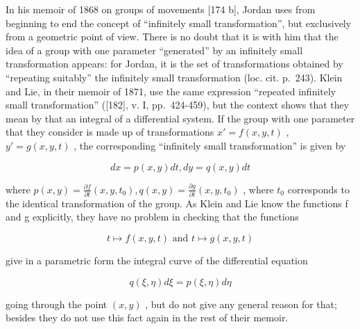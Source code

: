 In his memoir of 1868 on groups of movements {[}174 b{]}, Jordan uses from beginning to end the concept of ``infinitely small transformation'', but exclusively from a geometric point of view. There is no doubt that it is with him that the idea of a group with one parameter ``generated'' by an infinitely small transformation appears: for Jordan, it is the set of transformations obtained by ``repeating suitably'' the infinitely small transformation (loc. cit. p.~243). Klein and Lie, in their memoir of 1871, use the same expression ``repeated infinitely small transformation'' ({[}182{]}, v. I, pp.~424-459), but the context shows that they mean by that an integral of a differential system. If the group with one parameter that they consider is made up of transformations \(x' = f(x, y, t)\) , \(y' = g(x, y, t)\) , the corresponding ``infinitely small transformation'' is given by

\[
d x = p (x, y) d t, d y = q (x, y) d t
\]

where \(p(x,y)=\frac{\partial f}{\partial t}(x,y,t_{0}),q(x,y)=\frac{\partial g}{\partial t}(x,y,t_{0})\) , where \(t_{0}\) corresponds to the identical transformation of the group. As Klein and Lie know the functions f and g explicitly, they have no problem in checking that the functions

\[
t \mapsto f (x, y, t) \text {   and   } t \mapsto g (x, y, t)
\]

give in a parametric form the integral curve of the differential equation

\[
q (\xi , \eta) d \xi = p (\xi , \eta) d \eta
\]

going through the point \((x,y)\) , but do not give any general reason for that; besides they do not use this fact again in the rest of their memoir.

